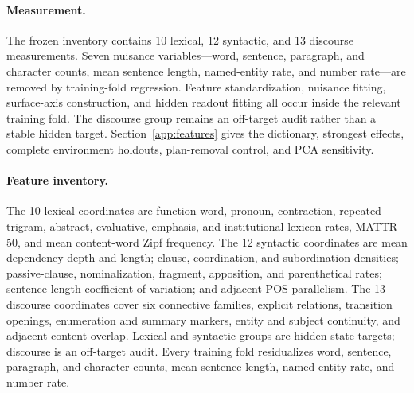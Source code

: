 \paragraph{Measurement.} The frozen inventory contains 10 lexical, 12 syntactic, and 13 discourse measurements. Seven nuisance variables---word, sentence, paragraph, and character counts, mean sentence length, named-entity rate, and number rate---are removed by training-fold regression. Feature standardization, nuisance fitting, surface-axis construction, and hidden readout fitting all occur inside the relevant training fold. The discourse group remains an off-target audit rather than a stable hidden target. Section~\ref{app:features} gives the dictionary, strongest effects, complete environment holdouts, plan-removal control, and PCA sensitivity.

\paragraph{Feature inventory.} The 10 lexical coordinates are function-word, pronoun, contraction, repeated-trigram, abstract, evaluative, emphasis, and institutional-lexicon rates, MATTR-50, and mean content-word Zipf frequency. The 12 syntactic coordinates are mean dependency depth and length; clause, coordination, and subordination densities; passive-clause, nominalization, fragment, apposition, and parenthetical rates; sentence-length coefficient of variation; and adjacent POS parallelism. The 13 discourse coordinates cover six connective families, explicit relations, transition openings, enumeration and summary markers, entity and subject continuity, and adjacent content overlap. Lexical and syntactic groups are hidden-state targets; discourse is an off-target audit. Every training fold residualizes word, sentence, paragraph, and character counts, mean sentence length, named-entity rate, and number rate.

